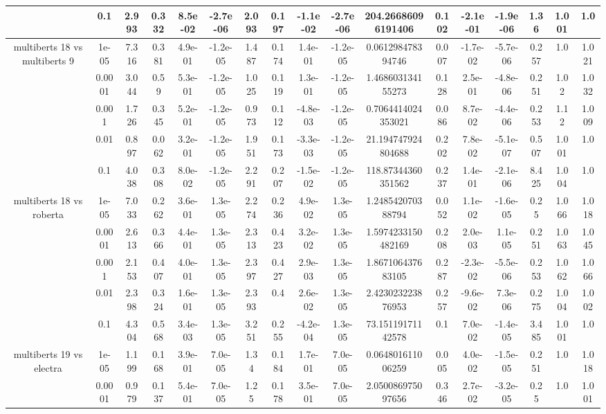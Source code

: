 \begin{tabular}{|c|c|c|c|c|c|c|c|c|c|c|c|c|c|c|c|c|}
 & 0.1 & 2.993 & 0.332 & 8.5e-02 & -2.7e-06 & 2.093 & 0.197 & -1.1e-02 & -2.7e-06 & 204.26686096191406 & 0.102 & -2.1e-01 & -1.9e-06 & 1.36 & 1.001 & 1.0 \\
\hline
\multirow{5}{*}{multiberts 18 vs multiberts 9} & 1e-05 & 7.316 & 0.381 & 4.9e-01 & -1.2e-05 & 1.487 & 0.174 & 1.4e-01 & -1.2e-05 & 0.061298478394746 & 0.007 & -1.7e-02 & -5.7e-06 & 0.257 & 1.0 & 1.021 \\
 & 0.0001 & 3.044 & 0.59 & 5.3e-01 & -1.2e-05 & 1.025 & 0.119 & 1.3e-01 & -1.2e-05 & 1.468603134155273 & 0.128 & 2.5e-01 & -4.8e-06 & 0.251 & 1.02 & 1.032 \\
 & 0.001 & 1.726 & 0.345 & 5.2e-01 & -1.2e-05 & 0.973 & 0.112 & -4.8e-03 & -1.2e-05 & 0.7064414024353021 & 0.086 & 8.7e-02 & -4.4e-06 & 0.253 & 1.12 & 1.009 \\
 & 0.01 & 0.897 & 0.062 & 3.2e-01 & -1.2e-05 & 1.951 & 0.173 & -3.3e-03 & -1.2e-05 & 21.194747924804688 & 0.202 & 7.8e-02 & -5.1e-07 & 0.507 & 1.001 & 1.0 \\
 & 0.1 & 4.038 & 0.308 & 8.0e-02 & -1.2e-05 & 2.291 & 0.207 & -1.5e-02 & -1.2e-05 & 118.87344360351562 & 0.237 & 1.4e-01 & -2.1e-06 & 8.425 & 1.004 & 1.0 \\
\hline
\multirow{5}{*}{multiberts 18 vs roberta } & 1e-05 & 7.033 & 0.262 & 3.6e-01 & 1.3e-05 & 2.274 & 0.236 & 4.9e-02 & 1.3e-05 & 1.248542070388794 & 0.052 & 1.1e-02 & -1.6e-05 & 0.25 & 1.066 & 1.018 \\
 & 0.0001 & 2.613 & 0.366 & 4.4e-01 & 1.3e-05 & 2.313 & 0.423 & 3.2e-02 & 1.3e-05 & 1.5974233150482169 & 0.208 & 2.0e-03 & 1.1e-05 & 0.251 & 1.063 & 1.045 \\
 & 0.001 & 2.153 & 0.407 & 4.0e-01 & 1.3e-05 & 2.397 & 0.427 & 2.9e-03 & 1.3e-05 & 1.867106437683105 & 0.287 & -2.3e-02 & -5.5e-06 & 0.253 & 1.062 & 1.066 \\
 & 0.01 & 2.398 & 0.324 & 1.6e-01 & 1.3e-05 & 2.393 & 0.4 & 2.6e-02 & 1.3e-05 & 2.423023223876953 & 0.257 & -9.6e-02 & 7.3e-06 & 0.275 & 1.004 & 1.002 \\
 & 0.1 & 4.304 & 0.568 & 3.4e-03 & 1.3e-05 & 3.251 & 0.255 & -4.2e-04 & 1.3e-05 & 73.15119171142578 & 0.1 & 7.0e-02 & -1.4e-05 & 3.485 & 1.001 & 1.0 \\
\hline
\multirow{5}{*}{multiberts 19 vs electra } & 1e-05 & 1.199 & 0.168 & 3.9e-01 & 7.0e-05 & 1.34 & 0.184 & 1.7e-01 & 7.0e-05 & 0.064801611006259 & 0.005 & 4.0e-02 & -1.5e-05 & 0.251 & 1.0 & 1.018 \\
 & 0.0001 & 0.979 & 0.137 & 5.4e-01 & 7.0e-05 & 1.25 & 0.178 & 3.5e-01 & 7.0e-05 & 2.050086975097656 & 0.346 & 2.7e-02 & -3.2e-05 & 0.25 & 1.0 & 1.001 \\

\end{tabular}
